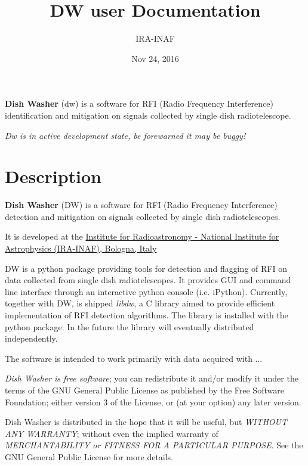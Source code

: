 \documentclass[letterpaper,10pt,english]{sphinxmanual}
\title{DW user Documentation}
\date{Nov 24, 2016}
\author{IRA-INAF}
\begin{document}
\maketitle
\tableofcontents
{}\label{index::doc}



\textbf{Dish Washer} (dw) is a software for RFI (Radio Frequency Interference) identification and mitigation on signals collected by single dish radiotelescope.

\emph{Dw is in active development state, be forewarned it may be buggy!}


\chapter{Description}
\label{intro:welcome-to-dw-user-s-documentation}\label{intro::doc}\label{intro:description}
\textbf{Dish Washer} (DW) is a software for RFI (Radio Frequency Interference) detection and mitigation on signals collected by single dish radiotelescopes.

It is developed at the \href{http://www.ira.inaf.it}{Institute for Radioastronomy - National Institute for Astrophysics (IRA-INAF), Bologna, Italy}

DW is a python package providing tools for detection and flagging of RFI
on data collected from single dish radiotelescopes. It provides GUI and command
line interface through an interactive python console (i.e. iPython).
Currently, together with DW, is shipped \emph{libdw}, a C library aimed to provide
efficient implementation of RFI detection algorithms. The library is installed
with the python package. In the future the library will eventually distributed independently.

The software is intended to work primarily with data acquired with ...

\emph{Dish Washer is free software}; you can redistribute it and/or modify
it under the terms of the GNU General Public License as published by
the Free Software Foundation; either version 3 of the License, or
(at your option) any later version.

Dish Washer is distributed in the hope that it will be useful,
but \emph{WITHOUT ANY WARRANTY}; without even the implied warranty of
\emph{MERCHANTABILITY or FITNESS FOR A PARTICULAR PURPOSE}.  See the
GNU General Public License for more details.
\end{document}
